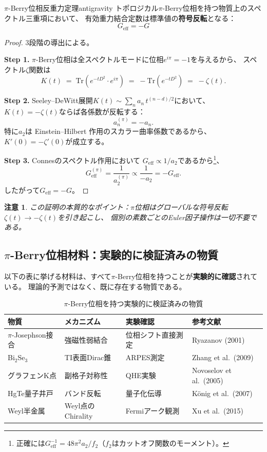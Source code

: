 \documentclass[11pt,a4paper]{article}
\newtheorem{remark}[theorem]{注意}
\newcommand{\Tr}{\mathrm{Tr}}
\newcommand{\Geff}{G_{\mathrm{eff}}}
\begin{document}
\begin{keytheorem}{$\pi$-Berry位相反重力定理}{antigravity}
トポロジカル$\pi$-Berry位相を持つ物質上のスペクトル三重項において、
有効重力結合定数は標準値の\textbf{符号反転}となる：
\[
\boxed{\Geff = -G}
\]
\end{keytheorem}

\begin{proof}
3段階の導出による。

\textbf{Step 1.} $\pi$-Berry位相は全スペクトルモードに位相$e^{i\pi}=-1$を与えるから、
スペクトル$\zeta$関数は
\[
K(t) \;=\; \Tr(e^{-tD^2} \cdot e^{i\pi}) \;=\; -\Tr(e^{-tD^2}) \;=\; -\zeta(t).
\]

\textbf{Step 2.} Seeley--DeWitt展開$K(t) \sim \sum_n a_n \, t^{(n-d)/2}$において、
$K(t) = -\zeta(t)$ならば各係数が反転する：
\[
a_n^{(\pi)} = -a_n.
\]
特に$a_2$は Einstein--Hilbert 作用のスカラー曲率係数であるから、
$K'(0) = -\zeta'(0)$が成立する。

\textbf{Step 3.} Connesのスペクトル作用において
$\Geff \propto 1/a_2$であるから\footnote{%
正確には$\Geff^{-1} = 48\pi^2 a_2 / f_2$（$f_2$はカットオフ関数のモーメント）。}、
\[
\Geff^{(\pi)} = \frac{1}{a_2^{(\pi)}} \propto \frac{1}{-a_2} = -\Geff.
\]
したがって$\Geff = -G$。\qedhere
\end{proof}

\begin{remark}
この証明の本質的なポイント：$\pi$位相はグローバルな符号反転$\zeta(t)\to-\zeta(t)$を引き起こし、
個別の素数ごとのEuler因子操作は一切不要である。
\end{remark}


\subsection{$\pi$-Berry位相材料：実験的に検証済みの物質}
\label{sec:12.2}

以下の表に挙げる材料は、すべて$\pi$-Berry位相を持つことが\textbf{実験的に確認}されている。
理論的予測ではなく、既に存在する物質である。

\begin{table}[htbp]
\centering
\caption{$\pi$-Berry位相を持つ実験的に検証済みの物質}
\label{tab:pi-berry-materials}
\begin{tabular}{@{}llll@{}}
\toprule
\textbf{物質} & \textbf{メカニズム} & \textbf{実験確認} & \textbf{参考文献} \\
\midrule
$\pi$-Josephson接合 & 強磁性弱結合 & 位相シフト直接測定 & Ryazanov (2001) \\
Bi$_2$Se$_3$ & TI表面Dirac錐 & ARPES測定 & Zhang et al.\ (2009) \\
グラフェンK点 & 副格子対称性 & QHE実験 & Novoselov et al.\ (2005) \\
HgTe量子井戸 & バンド反転 & 量子化伝導 & K\"onig et al.\ (2007) \\
Weyl半金属 & Weyl点のChirality & Fermiアーク観測 & Xu et al.\ (2015) \\
\bottomrule
\end{tabular}
\end{table}
\end{document}
